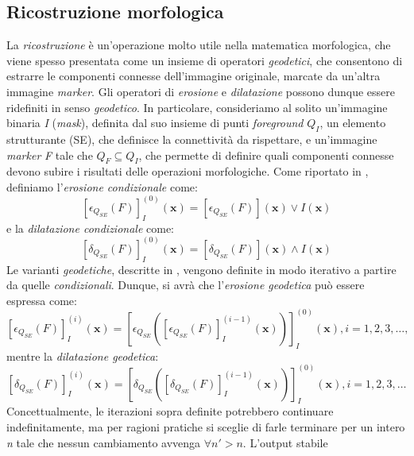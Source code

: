 \subsection{Ricostruzione morfologica}
\label{subsec:math-morph-reconstruction}
La \textit{ricostruzione} \`e un'operazione molto utile nella matematica morfologica, che viene spesso presentata come un insieme di operatori \textit{geodetici}, che consentono di estrarre le componenti connesse dell'immagine originale, marcate da un'altra immagine \textit{marker}. Gli operatori di \textit{erosione} e \textit{dilatazione} possono dunque essere ridefiniti in senso \textit{geodetico}. In particolare, consideriamo al solito un'immagine binaria \textit{I} (\textit{mask}), definita dal suo insieme di punti \textit{foreground} $Q_{I}$, un elemento strutturante (SE), che definisce la connettivit\`a da rispettare, e un'immagine \textit{marker} \textit{F} tale che $Q_{F} \subseteq Q_{I}$, che permette di definire quali componenti connesse devono subire i risultati delle operazioni morfologiche. Come riportato in \cite{bib:binary-image-analysis}, definiamo l'\textit{erosione condizionale} come:
\begin{equation}
	\label{eq:conditional-erosion}
	[\epsilon_{Q_{SE}}(F)]^{(0)}_{I}(\textbf{x}) = [\epsilon_{Q_{SE}}(F)](\textbf{x}) \vee I(\textbf{x})
\end{equation}
e la \textit{dilatazione condizionale} come:
\begin{equation}
	\label{eq:conditional-dilation}
	[\delta_{Q_{SE}}(F)]^{(0)}_{I}(\textbf{x}) = [\delta_{Q_{SE}}(F)](\textbf{x}) \wedge I(\textbf{x})
\end{equation}
Le varianti \textit{geodetiche}, descritte in \cite{bib:top-hat-paper}, vengono definite in modo iterativo a partire da quelle \textit{condizionali}. Dunque, si avr\`a che l'\textit{erosione geodetica} pu\`o essere espressa come:
\begin{equation}
	\label{eq:geodesic-erosion}
	[\epsilon_{Q_{SE}}(F)]^{(i)}_{I}(\textbf{x}) = [\epsilon_{Q_{SE}}([\epsilon_{Q_{SE}}(F)]^{(i-1)}_{I}(\textbf{x}))]^{(0)}_{I}(\textbf{x}), i=1,2,3,\dots,
\end{equation}
mentre la \textit{dilatazione geodetica}:
\begin{equation}
	\label{eq:geodesic-dilation}
	[\delta_{Q_{SE}}(F)]^{(i)}_{I}(\textbf{x}) = [\delta_{Q_{SE}}([\delta_{Q_{SE}}(F)]^{(i-1)}_{I}(\textbf{x}))]^{(0)}_{I}(\textbf{x}), i=1,2,3,\dots
\end{equation}
Concettualmente, le iterazioni sopra definite potrebbero continuare indefinitamente, ma per ragioni pratiche si sceglie di farle terminare per un intero \textit{n} tale che nessun cambiamento avvenga $\forall n' > n$. L'output stabile 
